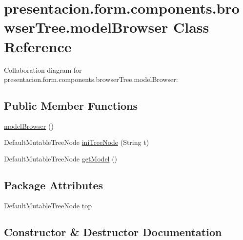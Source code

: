\hypertarget{classpresentacion_1_1form_1_1components_1_1browserTree_1_1modelBrowser}{}\section{presentacion.\+form.\+components.\+browser\+Tree.\+model\+Browser Class Reference}
\label{classpresentacion_1_1form_1_1components_1_1browserTree_1_1modelBrowser}


Collaboration diagram for presentacion.\+form.\+components.\+browser\+Tree.\+model\+Browser\+:
\subsection*{Public Member Functions}
\begin{DoxyCompactItemize}
\item 
\hyperlink{classpresentacion_1_1form_1_1components_1_1browserTree_1_1modelBrowser_afe4a3636c2b53161acb015dde9bfa58e}{model\+Browser} ()
\item 
Default\+Mutable\+Tree\+Node \hyperlink{classpresentacion_1_1form_1_1components_1_1browserTree_1_1modelBrowser_afcbfb73081526954d46d410be9821848}{ini\+Tree\+Node} (String t)
\item 
Default\+Mutable\+Tree\+Node \hyperlink{classpresentacion_1_1form_1_1components_1_1browserTree_1_1modelBrowser_ad0362719968bd949b1b1639eba9c2e3b}{get\+Model} ()
\end{DoxyCompactItemize}
\subsection*{Package Attributes}
\begin{DoxyCompactItemize}
\item 
Default\+Mutable\+Tree\+Node \hyperlink{classpresentacion_1_1form_1_1components_1_1browserTree_1_1modelBrowser_a9fc1c6e81c509d87948fb3e47b79204b}{top}
\end{DoxyCompactItemize}


\subsection{Constructor \& Destructor Documentation}
\mbox{\label{classpresentacion_1_1form_1_1components_1_1browserTree_1_1modelBrowser_afe4a3636c2b53161acb015dde9bfa58e}} 
